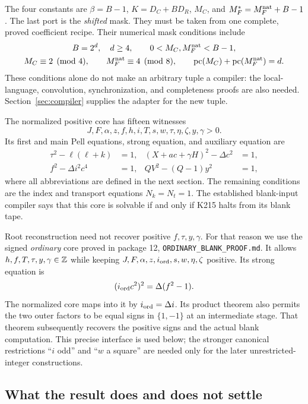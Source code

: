 The four constants are $\beta=B-1$, $K=D_C+BD_R$, $M_C$, and
$M_F^*=M_F^{\rm nat}+B-1$.  The last port is the \emph{shifted} mask.
They must be taken from one complete, proved coefficient recipe.
Their numerical mask conditions include
\begin{gather*}
B=2^d,\quad d\ge4,\qquad
0<M_C,M_F^{\rm nat}<B-1,\\
M_C\equiv2\pmod4,\qquad M_F^{\rm nat}\equiv4\pmod8,\qquad
\operatorname{pc}(M_C)+\operatorname{pc}(M_F^{\rm nat})=d.
\end{gather*}
These conditions alone do not make an arbitrary tuple a compiler:
the local-language, convolution, synchronization, and completeness
proofs are also needed.  Section~\ref{sec:compiler} supplies the adapter
for the new tuple.

The normalized positive core has fifteen witnesses
\[
J,F,\alpha,z,f,h,i,T,s,w,\tau,\eta,\zeta,y,\gamma>0.
\]
Its first and main Pell equations, strong equation, and auxiliary
equation are
\begin{align}
\tau^2-\ell(\ell+k)&=1, &
(X+ac+\gamma H)^2-\Delta c^2&=1,\label{eq:old-first-main}\\
f^2-\Delta i^2c^4&=1, &
Q V^2-(Q-1)y^2&=1,\label{eq:old-strong-aux}
\end{align}
where all abbreviations are defined in the next section.  The remaining
conditions are the index and transport equations $N_k=N_t=1$.
The established blank-input compiler says that this core is solvable
if and only if K215 halts from its blank tape.

Root reconstruction need not recover positive $f,\tau,y,\gamma$.
For that reason we use the signed \emph{ordinary} core proved in package
12, \texttt{ORDINARY\_BLANK\_PROOF.md}.  It allows
$h,f,T,\tau,y,\gamma\in\mathbb Z$ while keeping
$J,F,\alpha,z,i_{\rm ord},s,w,\eta,\zeta$ positive.  Its strong equation is
\[
(i_{\rm ord}c^2)^2=\Delta(f^2-1).
\]
The normalized core maps into it by $i_{\rm ord}=\Delta i$.
Its product theorem also permits the two outer factors to be equal
signs in $\{1,-1\}$ at an intermediate stage.  That theorem subsequently
recovers the positive signs and the actual blank computation.  This
precise interface is used below; the stronger canonical restrictions
``$i$ odd'' and ``$w$ a square'' are needed only for the later
unrestricted-integer constructions.

\subsection{What the result does and does not settle}

